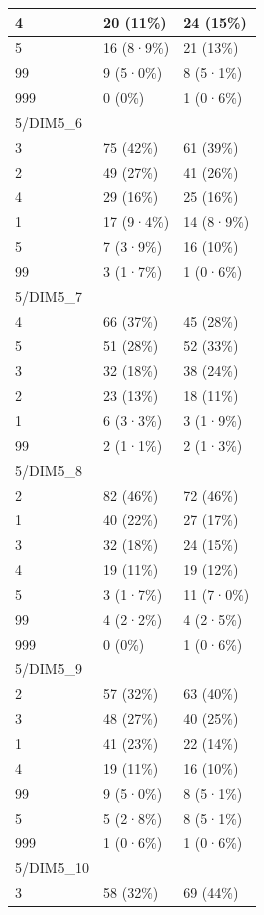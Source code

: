 \documentclass[
]{book}
\begin{document}
\begin{tabular}{l|l|l}
\hline
4 & 20 (11\%) & 24 (15\%)\\
\hline
5 & 16 (8·9\%) & 21 (13\%)\\
\hline
99 & 9 (5·0\%) & 8 (5·1\%)\\
\hline
999 & 0 (0\%) & 1 (0·6\%)\\
\hline
5/DIM5\_6 &  & \\
\hline
3 & 75 (42\%) & 61 (39\%)\\
\hline
2 & 49 (27\%) & 41 (26\%)\\
\hline
4 & 29 (16\%) & 25 (16\%)\\
\hline
1 & 17 (9·4\%) & 14 (8·9\%)\\
\hline
5 & 7 (3·9\%) & 16 (10\%)\\
\hline
99 & 3 (1·7\%) & 1 (0·6\%)\\
\hline
5/DIM5\_7 &  & \\
\hline
4 & 66 (37\%) & 45 (28\%)\\
\hline
5 & 51 (28\%) & 52 (33\%)\\
\hline
3 & 32 (18\%) & 38 (24\%)\\
\hline
2 & 23 (13\%) & 18 (11\%)\\
\hline
1 & 6 (3·3\%) & 3 (1·9\%)\\
\hline
99 & 2 (1·1\%) & 2 (1·3\%)\\
\hline
5/DIM5\_8 &  & \\
\hline
2 & 82 (46\%) & 72 (46\%)\\
\hline
1 & 40 (22\%) & 27 (17\%)\\
\hline
3 & 32 (18\%) & 24 (15\%)\\
\hline
4 & 19 (11\%) & 19 (12\%)\\
\hline
5 & 3 (1·7\%) & 11 (7·0\%)\\
\hline
99 & 4 (2·2\%) & 4 (2·5\%)\\
\hline
999 & 0 (0\%) & 1 (0·6\%)\\
\hline
5/DIM5\_9 &  & \\
\hline
2 & 57 (32\%) & 63 (40\%)\\
\hline
3 & 48 (27\%) & 40 (25\%)\\
\hline
1 & 41 (23\%) & 22 (14\%)\\
\hline
4 & 19 (11\%) & 16 (10\%)\\
\hline
99 & 9 (5·0\%) & 8 (5·1\%)\\
\hline
5 & 5 (2·8\%) & 8 (5·1\%)\\
\hline
999 & 1 (0·6\%) & 1 (0·6\%)\\
\hline
5/DIM5\_10 &  & \\
\hline
3 & 58 (32\%) & 69 (44\%)\\

\end{tabular}
\end{document}
